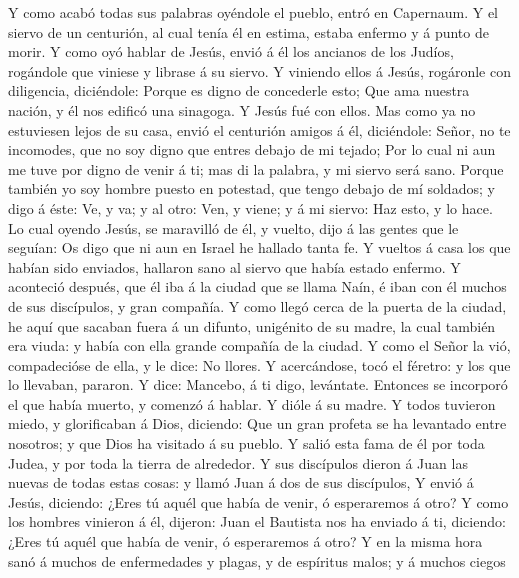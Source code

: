  Y como acabó todas sus palabras oyéndole el pueblo, entró
en Capernaum.  Y el siervo de un centurión, al cual tenía
él en estima, estaba enfermo y á punto de morir.  Y como
oyó hablar de Jesús, envió á él los ancianos de los Judíos, rogándole
que viniese y librase á su siervo.  Y viniendo ellos á
Jesús, rogáronle con diligencia, diciéndole: Porque es digno de
concederle esto;  Que ama nuestra nación, y él nos edificó
una sinagoga.  Y Jesús fué con ellos. Mas como ya no
estuviesen lejos de su casa, envió el centurión amigos á él, diciéndole:
Señor, no te incomodes, que no soy digno que entres debajo de mi tejado;
 Por lo cual ni aun me tuve por digno de venir á ti; mas
di la palabra, y mi siervo será sano.  Porque también yo
soy hombre puesto en potestad, que tengo debajo de mí soldados; y digo á
éste: Ve, y va; y al otro: Ven, y viene; y á mi siervo: Haz esto, y lo
hace.  Lo cual oyendo Jesús, se maravilló de él, y vuelto,
dijo á las gentes que le seguían: Os digo que ni aun en Israel he
hallado tanta fe.  Y vueltos á casa los que habían sido
enviados, hallaron sano al siervo que había estado enfermo.
 Y aconteció después, que él iba á la ciudad que se llama
Naín, é iban con él muchos de sus discípulos, y gran compañía.
 Y como llegó cerca de la puerta de la ciudad, he aquí
que sacaban fuera á un difunto, unigénito de su madre, la cual también
era viuda: y había con ella grande compañía de la ciudad.
 Y como el Señor la vió, compadecióse de ella, y le dice:
No llores.  Y acercándose, tocó el féretro: y los que lo
llevaban, pararon. Y dice: Mancebo, á ti digo, levántate.
 Entonces se incorporó el que había muerto, y comenzó á
hablar. Y dióle á su madre.  Y todos tuvieron miedo, y
glorificaban á Dios, diciendo: Que un gran profeta se ha levantado entre
nosotros; y que Dios ha visitado á su pueblo.  Y salió
esta fama de él por toda Judea, y por toda la tierra de alrededor.
 Y sus discípulos dieron á Juan las nuevas de todas estas
cosas: y llamó Juan á dos de sus discípulos,  Y envió á
Jesús, diciendo: ¿Eres tú aquél que había de venir, ó esperaremos á
otro?  Y como los hombres vinieron á él, dijeron: Juan el
Bautista nos ha enviado á ti, diciendo: ¿Eres tú aquél que había de
venir, ó esperaremos á otro?  Y en la misma hora sanó á
muchos de enfermedades y plagas, y de espíritus malos; y á muchos ciegos
